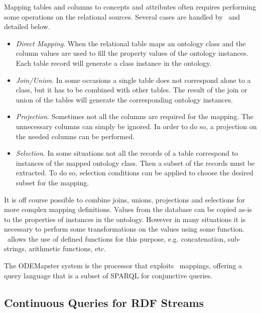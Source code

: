 Mapping tables and columns to concepts and attributes often requires performing some operations on the relational sources. Several cases are handled by \rtwoo\ and detailed below.
\begin{itemize}
\item \textit{Direct Mapping}. When the relational table maps an ontology class and the column values are used to fill the property values of the ontology instances. Each table record will generate a class instance in the ontology.
\item \textit{Join/Union}. In some occasions a single table does not correspond alone to a class, but it has to be combined with other tables. The result of the join or union of the tables will generate the corresponding ontology instances.
\item \textit{Projection}. Sometimes not all the columns are required for the mapping. The unnecessary columns can simply be ignored. In order to do so, a projection on the needed columns can be performed. %
\item \textit{Selection}. In some situations not all the records of a table correspond to instances of the mapped ontology class. Then a subset of the records must be extracted. To do so, selection conditions can be applied to choose the desired subset for the mapping.
\end{itemize}
It is off course possible to combine joins, unions, projections and selections for more complex mapping definitions.
Values from the database can be copied as-is to the properties of instances in the ontology. However in many situations
it is necessary to perform some transformations on the values using some function. \rtwoo\ allows the use of defined
functions for this purpose, e.g. concatenation, sub-strings, arithmetic functions, etc.

The ODEMapster \cite{Barrasa_04} system is the processor that exploits \rtwoo\ mappings, offering a query language that
is a subset of SPARQL for conjunctive queries.

\subsection{Continuous Queries for RDF Streams}
\label{rdfstreams}




